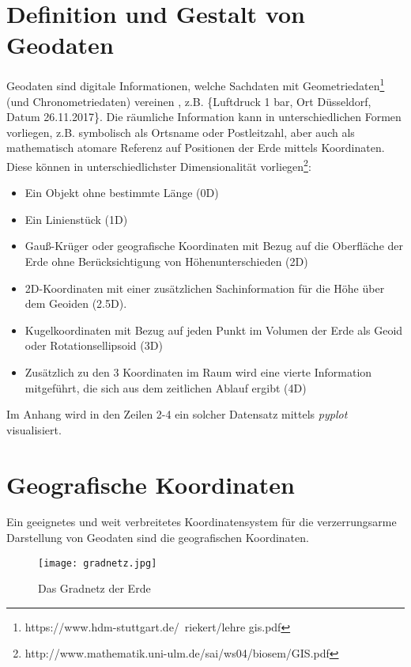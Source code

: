 \documentclass[11pt,ceqn]{book}
\begin{document}
\section{Definition und Gestalt von Geodaten}
Geodaten sind digitale Informationen, welche Sachdaten mit Geometriedaten\footnote{https://www.hdm-stuttgart.de/~riekert/lehre gis.pdf} (und Chronometriedaten) vereinen , z.B. \{Luftdruck 1 bar, Ort Düsseldorf, Datum 26.11.2017\}. 
Die räumliche Information kann in unterschiedlichen Formen vorliegen, z.B. symbolisch als Ortsname oder Postleitzahl, aber auch als mathematisch atomare Referenz auf Positionen der Erde mittels Koordinaten. Diese können in unterschiedlichster Dimensionalität vorliegen\footnote{http://www.mathematik.uni-ulm.de/sai/ws04/biosem/GIS.pdf}:
\begin{itemize}
\item Ein Objekt ohne bestimmte Länge (0D)
\item Ein Linienstück (1D)
\item
Gauß-Krüger oder geografische Koordinaten mit Bezug auf die Oberfläche der Erde ohne Berücksichtigung von Höhenunterschieden (2D)
\item 
2D-Koordinaten mit einer zusätzlichen Sachinformation für die Höhe über dem Geoiden (2.5D).
\item Kugelkoordinaten mit Bezug auf jeden Punkt im Volumen der Erde als
Geoid oder Rotationsellipsoid (3D)
\item 
Zusätzlich zu den 3 Koordinaten im Raum wird eine vierte
Information mitgeführt, die sich aus dem zeitlichen Ablauf ergibt (4D)
\end{itemize}

Im Anhang wird in den Zeilen 2-4 ein solcher Datensatz mittels \textit{pyplot} visualisiert.

\newpage

\section{Geografische Koordinaten}
Ein geeignetes und weit verbreitetes Koordinatensystem für die verzerrungsarme Darstellung von Geodaten sind die geografischen Koordinaten. 

\begin{figure}[H]
\centering
\texttt{[image: gradnetz.jpg]}
\caption{Das Gradnetz der Erde}\label{gradnetz}
\end{figure}
\end{document}
